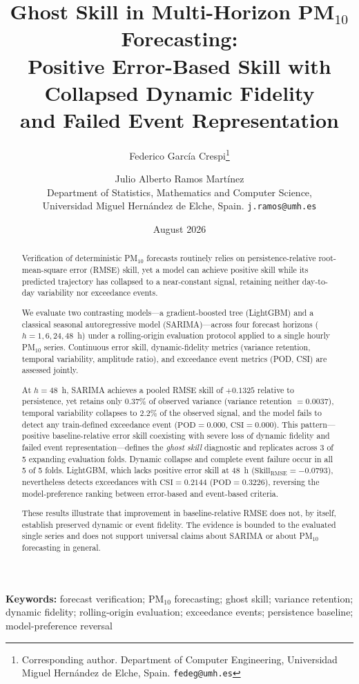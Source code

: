 \documentclass[12pt]{article}
\title{Ghost Skill in Multi-Horizon PM$_{10}$ Forecasting:\\
Positive Error-Based Skill with Collapsed Dynamic Fidelity\\
and Failed Event Representation}
\author{%
  Federico Garc\'ia Crespi\thanks{%
    Corresponding author.
    Department of Computer Engineering,
    Universidad Miguel Hern\'andez de Elche, Spain.
    \texttt{fedeg@umh.es}}
  \and
  Julio Alberto Ramos Mart\'inez\\
  Department of Statistics, Mathematics and Computer Science,\\
  Universidad Miguel Hern\'andez de Elche, Spain.
  \texttt{j.ramos@umh.es}%
}
\date{August 2026}
\providecommand{\keywords}[1]{\par\bigskip\noindent\textbf{Keywords:} #1}
\begin{document}
\maketitle

\begin{abstract}
Verification of deterministic PM$_{10}$ forecasts routinely relies on
persistence-relative root-mean-square error (RMSE) skill, yet a model
can achieve positive skill while its predicted trajectory has collapsed
to a near-constant signal, retaining neither day-to-day variability nor
exceedance events.

We evaluate two contrasting models---a gradient-boosted tree (LightGBM)
and a classical seasonal autoregressive model (SARIMA)---across four
forecast horizons ($h = 1, 6, 24, 48$~h) under a rolling-origin
evaluation protocol applied to a single hourly PM$_{10}$ series.
Continuous error skill, dynamic-fidelity metrics (variance retention,
temporal variability, amplitude ratio), and exceedance event metrics
(POD, CSI) are assessed jointly.

At $h = 48$~h, SARIMA achieves a pooled RMSE skill of $+0.1325$ relative
to persistence, yet retains only $0.37\%$ of observed variance (variance
retention $= 0.0037$), temporal variability collapses to $2.2\%$ of the
observed signal, and the model fails to detect any train-defined
exceedance event ($\mathrm{POD} = 0.000$, $\mathrm{CSI} = 0.000$).
This pattern---positive baseline-relative error skill coexisting with
severe loss of dynamic fidelity and failed event representation---defines
the \emph{ghost skill} diagnostic and replicates across 3 of 5 expanding
evaluation folds. Dynamic collapse and complete event failure occur in
all 5 of 5 folds. LightGBM, which lacks positive error skill at 48~h
($\mathrm{Skill}_\mathrm{RMSE} = -0.0793$), nevertheless detects
exceedances with $\mathrm{CSI} = 0.2144$ ($\mathrm{POD} = 0.3226$),
reversing the model-preference ranking between error-based and event-based
criteria.

These results illustrate that improvement in baseline-relative RMSE
does not, by itself, establish preserved dynamic or event fidelity.
The evidence is bounded to the evaluated single series and does not
support universal claims about SARIMA or about PM$_{10}$ forecasting
in general.
\end{abstract}

\keywords{forecast verification; PM$_{10}$ forecasting; ghost skill;
variance retention; dynamic fidelity; rolling-origin evaluation;
exceedance events; persistence baseline; model-preference reversal}
\end{document}
